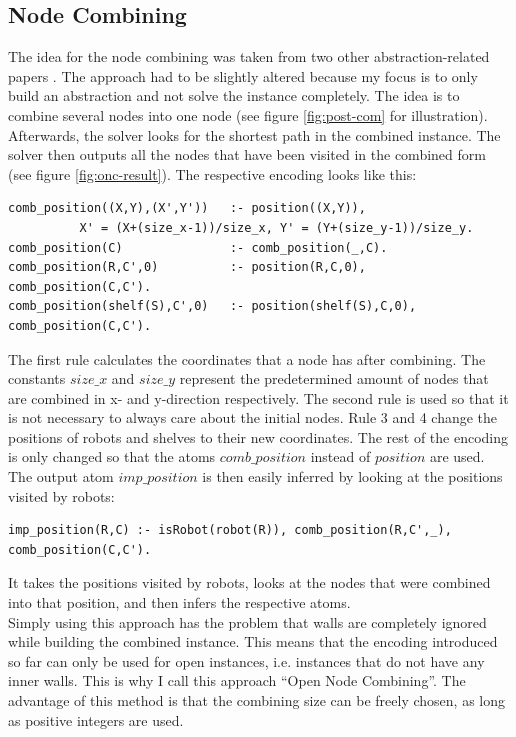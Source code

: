 \documentclass[runningheads]{llncs}
\begin{document}
\subsection{Node Combining}
The idea for the node combining was taken from two other abstraction-related papers \cite{nc1} \cite{nc2}. The approach had to be slightly altered because my focus is to only build an abstraction and not solve the instance completely. The idea is to combine several nodes into one node (see figure \ref{fig:post-com} for illustration). Afterwards, the solver looks for the shortest path in the combined instance. The solver then outputs all the nodes that have been visited in the combined form (see figure \ref{fig:onc-result}). The respective encoding looks like this:
\begin{verbatim}
comb_position((X,Y),(X',Y'))   :- position((X,Y)),
          X' = (X+(size_x-1))/size_x, Y' = (Y+(size_y-1))/size_y.
comb_position(C)               :- comb_position(_,C).
comb_position(R,C',0)          :- position(R,C,0), comb_position(C,C').
comb_position(shelf(S),C',0)   :- position(shelf(S),C,0), comb_position(C,C').
\end{verbatim}
The first rule calculates the coordinates that a node has after combining. The constants $size\_x$ and $size\_y$ represent the predetermined amount of nodes that are combined in x- and y-direction respectively. The second rule is used so that it is not necessary to always care about the initial nodes. Rule 3 and 4 change the positions of robots and shelves to their new coordinates. The rest of the encoding is only changed so that the atoms $comb\_position$ instead of $position$ are used. The output atom $imp\_position$ is then easily inferred by looking at the positions visited by robots:
\begin{verbatim}
imp_position(R,C) :- isRobot(robot(R)), comb_position(R,C',_), comb_position(C,C').
\end{verbatim}
It takes the positions visited by robots, looks at the nodes that were combined into that position, and then infers the respective atoms. \\
Simply using this approach has the problem that walls are completely ignored while building the combined instance. This means that the encoding introduced so far can only be used for open instances, i.e. instances that do not have any inner walls. This is why I call this approach ``Open Node Combining''. The advantage of this method is that the combining size can be freely chosen, as long as positive integers are used. \\
\end{document}
